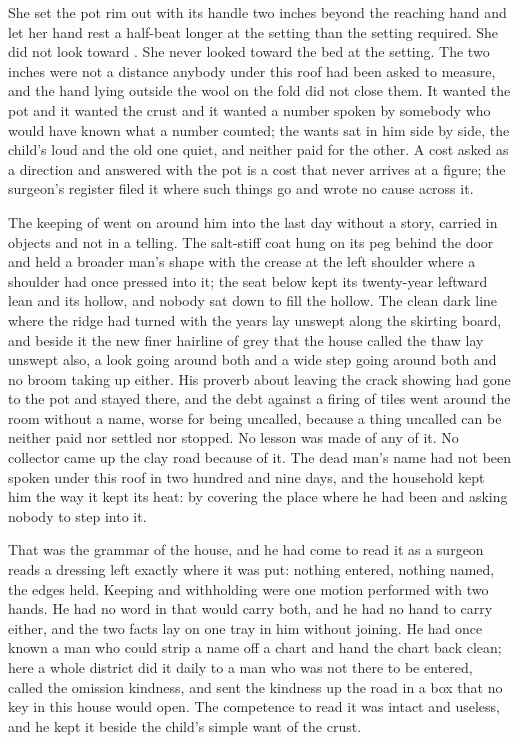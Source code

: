 She set the pot rim out with its handle two inches beyond the reaching hand and let her hand rest a half-beat longer at the setting than the setting required. She did not look toward . She never looked toward the bed at the setting. The two inches were not a distance anybody under this roof had been asked to measure, and the hand lying outside the wool on the fold did not close them. It wanted the pot and it wanted the crust and it wanted a number spoken by somebody who would have known what a number counted; the wants sat in him side by side, the child's loud and the old one quiet, and neither paid for the other. A cost asked as a direction and answered with the pot is a cost that never arrives at a figure; the surgeon's register filed it where such things go and wrote no cause across it.

The keeping of  went on around him into the last day without a story, carried in objects and not in a telling. The salt-stiff coat hung on its peg behind the door and held a broader man's shape with the crease at the left shoulder where a shoulder had once pressed into it; the seat below kept its twenty-year leftward lean and its hollow, and nobody sat down to fill the hollow. The clean dark line where the ridge had turned with the years lay unswept along the skirting board, and beside it the new finer hairline of grey that the house called the thaw lay unswept also, a look going around both and a wide step going around both and no broom taking up either. His proverb about leaving the crack showing had gone to the pot and stayed there, and the debt against a firing of tiles went around the room without a name, worse for being uncalled, because a thing uncalled can be neither paid nor settled nor stopped. No lesson was made of any of it. No collector came up the clay road because of it. The dead man's name had not been spoken under this roof in two hundred and nine days, and the household kept him the way it kept its heat: by covering the place where he had been and asking nobody to step into it.

That was the grammar of the house, and he had come to read it as a surgeon reads a dressing left exactly where it was put: nothing entered, nothing named, the edges held. Keeping and withholding were one motion performed with two hands. He had no word in  that would carry both, and he had no hand to carry either, and the two facts lay on one tray in him without joining. He had once known a man who could strip a name off a chart and hand the chart back clean; here a whole district did it daily to a man who was not there to be entered, called the omission kindness, and sent the kindness up the road in a box that no key in this house would open. The competence to read it was intact and useless, and he kept it beside the child's simple want of the crust.

